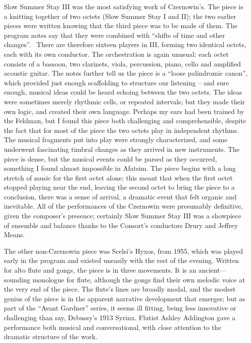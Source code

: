 Slow Summer Stay III was the most satisfying work of Czernowin’s. The piece is a knitting together of two octets (Slow Summer Stay I and II); the two earlier pieces were written knowing that the third piece was to be made of them. The program notes say that they were combined with “shifts of time and other changes”.  There are therefore sixteen players in III, forming two identical octets, each with its own conductor. The orchestration is again unusual: each octet consists of a bassoon, two clarinets, viola, percussion, piano, cello and amplified acoustic guitar. The notes further tell us the piece is a “loose palindromic canon”, which provided just enough scaffolding to structure our listening – and sure enough, musical ideas could be heard echoing between the two octets. The ideas were sometimes merely rhythmic cells, or repeated intervals; but they made their own logic, and created their own language. Perhaps my ears had been trained by the Feldman, but I found this piece both challenging and comprehensible, despite the fact that for most of the piece the two octets play in independent rhythms. The musical fragments put into play were strongly characterized, and some underwent fascinating timbral changes as they arrived in new instruments. The piece is dense, but the musical events could be parsed as they occurred, something I found almost impossible in Afatsim. The piece begins with a long stretch of music for the first octet alone; this meant that when the first octet stopped playing near the end, leaving the second octet to bring the piece to a conclusion, there was a sense of arrival, a dramatic event that felt organic and inevitable. All of the performances of the Czernowin were presumably definitive, given the composer’s presence; certainly Slow Summer Stay III was a showpiece of ensemble and balance thanks to the Consort’s conductors Drury and Jeffrey Means.

The other non-Czernowin piece was Scelsi’s Hyxos, from 1955, which was played early in the program and existed uneasily with the rest of the evening. Written for alto flute and gongs, the piece is in three movements. It is an ancient—sounding monologue for flute, although the gongs find their own melodic voice at the very end of the piece. The flute’s lines are broadly modal, and the modest genius of the piece is in the apparent narrative development that emerges; but as part of the “Avant Gardner” series, it seems ill fitting, being less innovative or challenging than say, Debussy’s 1913 Syrinx. Flutist Ashley Addington gave a performance both musical and conversational, with close attention to the dramatic structure of the work.
